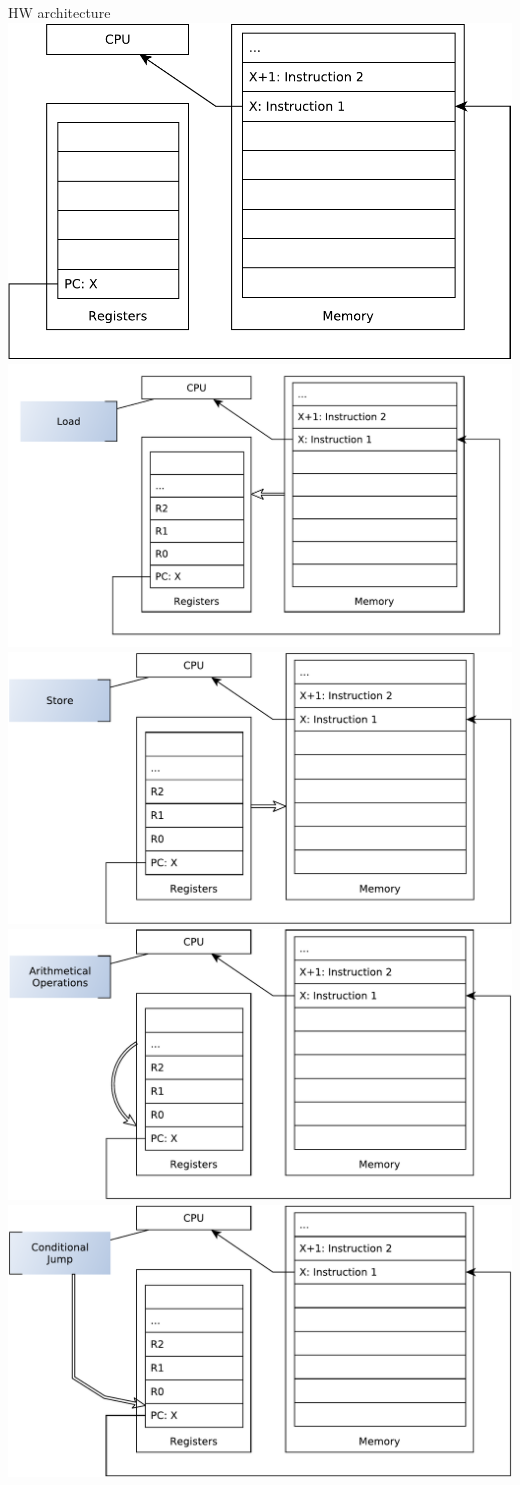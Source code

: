 \documentclass{beamer}
\begin{document}
\begin{frame}[t]{HW architecture}
{{}
     {
  \includegraphics[width=0.6\linewidth]{hw-4}
}
     {
  \includegraphics[width=0.8\linewidth]{hw-5}
}
     {
  \includegraphics[width=0.8\linewidth]{hw-6}
}
     {
  \includegraphics[width=0.8\linewidth]{hw-7}
}
     {
  \includegraphics[width=0.8\linewidth]{hw-8}
}}
\end{frame}
\end{document}

